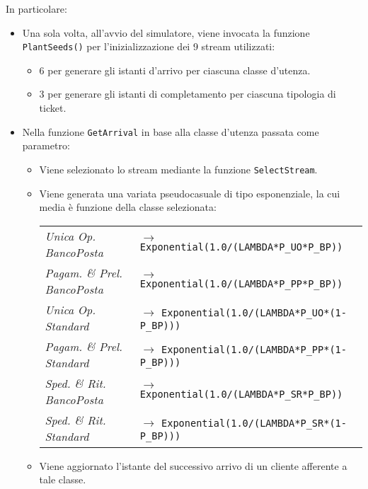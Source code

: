 In particolare:
\begin{itemize}
\item Una sola volta, all'avvio del simulatore, viene invocata la funzione \texttt{PlantSeeds()} per l'inizializzazione dei 9 stream utilizzati:
\begin{itemize}
\item 6 per generare gli istanti d'arrivo per ciascuna classe d'utenza.
\item 3 per generare gli istanti di completamento per ciascuna tipologia di ticket.
\end{itemize}

\item Nella funzione \texttt{GetArrival} in base alla classe d'utenza passata come parametro:
\begin{itemize}
\item Viene selezionato lo stream mediante la funzione \texttt{SelectStream}.
\item Viene generata una variata pseudocasuale di tipo esponenziale, la cui media è funzione della classe selezionata:
\begin{center}
\begin{tabular}{l l}
\textsl{Unica Op. BancoPosta} & $\to$ \texttt{Exponential(1.0/(LAMBDA*P\_UO*P\_BP))} \\
\textsl{Pagam. \& Prel. BancoPosta} & $\to$ \texttt{Exponential(1.0/(LAMBDA*P\_PP*P\_BP))} \\
\textsl{Unica Op. Standard} & $\to$ \texttt{Exponential(1.0/(LAMBDA*P\_UO*(1-P\_BP)))} \\
\textsl{Pagam. \& Prel. Standard} & $\to$ \texttt{Exponential(1.0/(LAMBDA*P\_PP*(1-P\_BP)))} \\
\textsl{Sped. \& Rit. BancoPosta} & $\to$ \texttt{Exponential(1.0/(LAMBDA*P\_SR*P\_BP))} \\
\textsl{Sped. \& Rit. Standard} & $\to$ \texttt{Exponential(1.0/(LAMBDA*P\_SR*(1-P\_BP)))} \\
\end{tabular}
\end{center}
\item Viene aggiornato l'istante del successivo arrivo di un cliente afferente a tale classe.
\end{itemize}


\end{itemize}
